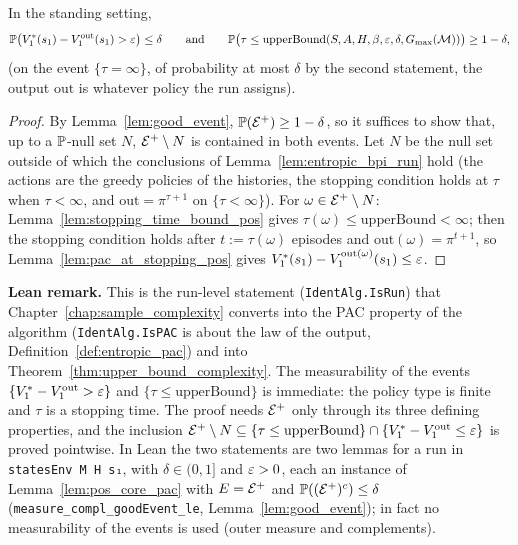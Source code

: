 \begin{lemma}\label{lem:pac_pos}
\leanok
{}
In the standing setting,
\[
  \mathbb{P}\big(V^*_1(s_1) - V^{\mathrm{out}}_1(s_1) > \varepsilon\big) \le \delta
  \qquad\text{and}\qquad
  \mathbb{P}\big(\tau \le \mathrm{upperBound}(S,A,H,\beta,\varepsilon,\delta,G_{\max}(\mathcal M))\big) \ge 1 - \delta ,
\]
(on the event $\{\tau = \infty\}$, of probability at most $\delta$ by the second statement, the
output $\mathrm{out}$ is whatever policy the run assigns).
\end{lemma}

\begin{proof}
\leanok
By Lemma~\ref{lem:good_event}, $\mathbb{P}(\mathcal{E}^+) \ge 1 - \delta$, so it suffices to show that, up to a
$\mathbb{P}$-null set $N$, $\mathcal{E}^+ \setminus N$ is contained in both events. Let $N$ be the null set
outside of which the conclusions of Lemma~\ref{lem:entropic_bpi_run} hold (the actions are the
greedy policies of the histories, the stopping condition holds at $\tau$ when $\tau < \infty$, and
$\mathrm{out} = \pi^{\tau + 1}$ on $\{\tau < \infty\}$). For $\omega \in \mathcal{E}^+ \setminus N$:
Lemma~\ref{lem:stopping_time_bound_pos} gives $\tau(\omega) \le \mathrm{upperBound} < \infty$; then the
stopping condition holds after $t := \tau(\omega)$ episodes and $\mathrm{out}(\omega) = \pi^{t+1}$, so
Lemma~\ref{lem:pac_at_stopping_pos} gives $V^*_1(s_1) - V^{\mathrm{out}(\omega)}_1(s_1) \le \varepsilon$.
\end{proof}

\textbf{Lean remark.} This is the run-level statement (\texttt{IdentAlg.IsRun}) that
Chapter~\ref{chap:sample_complexity} converts into the PAC property of the algorithm
(\texttt{IdentAlg.IsPAC} is about the law of the output, Definition~\ref{def:entropic_pac}) and into
Theorem~\ref{thm:upper_bound_complexity}. The measurability of the events $\{V^*_1 - V^{\mathrm{out}}_1 > \varepsilon\}$
and $\{\tau \le \mathrm{upperBound}\}$ is immediate: the policy type is finite and $\tau$ is a stopping time.
The proof needs $\mathcal{E}^+$ only through its three defining properties, and the inclusion
$\mathcal{E}^+ \setminus N \subseteq \{\tau \le \mathrm{upperBound}\} \cap \{V^*_1 - V^{\mathrm{out}}_1 \le \varepsilon\}$ is proved
pointwise. In Lean the two statements are two lemmas for a run in \texttt{statesEnv M H s₁}, with $\delta \in (0, 1]$
and $\varepsilon > 0$, each an instance of Lemma~\ref{lem:pos_core_pac} with $E = \mathcal{E}^+$ and
$\mathbb{P}((\mathcal{E}^+)^c) \le \delta$ (\texttt{measure\_compl\_goodEvent\_le}, Lemma~\ref{lem:good_event}); in fact no
measurability of the events is used (outer measure and complements).
